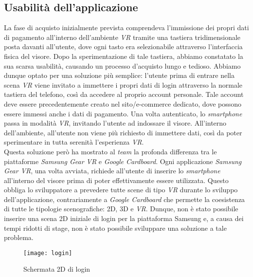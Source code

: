 \subsection{Usabilità dell'applicazione}

La fase di acquisto inizialmente prevista comprendeva l'immissione dei propri dati di pagamento all'interno dell'ambiente \textit{VR} tramite una tastiera tridimensionale posta davanti all'utente, dove ogni tasto era selezionabile attraverso l'interfaccia fisica del visore. Dopo la sperimentazione di tale tastiera, abbiamo constatato la sua scarsa usabilità, causando un processo d'acquisto lungo e tedioso. Abbiamo dunque optato per una soluzione più semplice: l'utente prima di entrare nella scena \textit{VR} viene invitato a immettere i propri dati di login attraverso la normale tastiera del telefono, così da accedere al proprio account personale. Tale account deve essere precedentemente creato nel sito/e-commerce dedicato, dove possono essere immessi anche i dati di pagamento. Una volta autenticato, lo \textit{smartphone} passa in modalità \textit{VR}, invitando l'utente ad indossare il visore. All'interno dell'ambiente, all'utente non viene più richiesto di immettere dati, così da poter sperimentare in tutta serenità l'esperienza \textit{VR}. \\
Questa soluzione però ha mostrato al \textit{team} la profonda differenza tra le piattaforme \textit{Samsung Gear VR} e \textit{Google Cardboard}. Ogni applicazione \textit{Samsung Gear VR}, una volta avviata, richiede all'utente di inserire lo \textit{smartphone} all'interno del visore prima di poter effettivamente essere utilizzata. Questo obbliga lo sviluppatore a prevedere tutte scene di tipo \textit{VR} durante lo sviluppo dell'applicazione, contrariamente a \textit{Google Cardboard} che permette la coesistenza di tutte le tipologie scenografiche: 2D, 3D e \textit{VR}. Dunque, non è stato possibile inserire una scena 2D iniziale di login per la piattaforma Samsung e, a causa dei tempi ridotti di stage, non è stato possibile sviluppare una soluzione a tale problema.

\label{Login}
\begin{figure}[ht]
	\begin{center}
		\texttt{[image: login]}
		\caption{Schermata 2D di login}
	\end{center}
\end{figure}
\FloatBarrier

